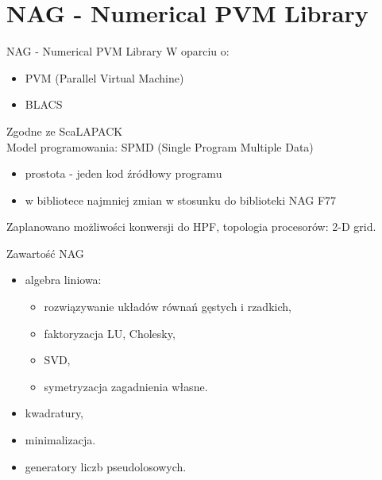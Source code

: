 \section{NAG - Numerical PVM Library}
	\begin{frame}{NAG - Numerical PVM Library}
	W oparciu o: 
		\begin{itemize}
			\item PVM (Parallel Virtual Machine)
			\item BLACS
		\end{itemize}
		Zgodne ze ScaLAPACK \\
		Model programowania: SPMD (Single Program Multiple Data)
		\begin{itemize}
			\item prostota - jeden kod źródłowy programu	
			\item w bibliotece najmniej zmian w stosunku do biblioteki NAG F77
		\end{itemize}
		Zaplanowano możliwości konwersji do HPF, topologia procesorów: 2-D grid. 
	\end{frame}
	\begin{frame}{Zawartość NAG}
		\begin{itemize}
			\item algebra liniowa:
				\begin{itemize}
					\item rozwiązywanie układów równań gęstych i rzadkich,
					\item faktoryzacja LU, Cholesky,
					\item SVD,
					\item symetryzacja zagadnienia własne.
				\end{itemize}
			\item kwadratury,
			\item minimalizacja.
			\item generatory liczb pseudolosowych.
		\end{itemize}
		
	\end{frame}